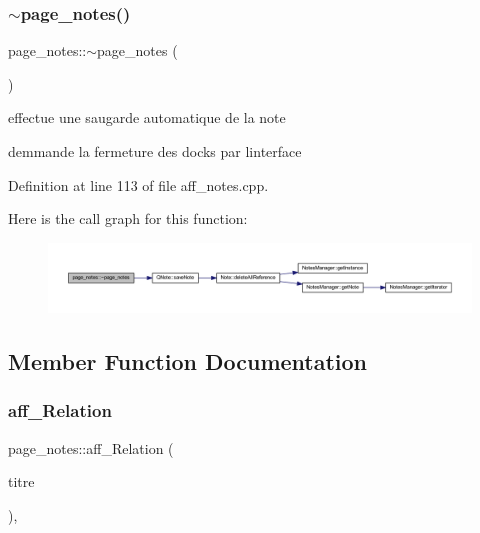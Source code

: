 \subsubsection{\texorpdfstring{$\sim$page\+\_\+notes()}{~page\_notes()}}
{\footnotesize\ttfamily page\+\_\+notes\+::$\sim$page\+\_\+notes (\begin{DoxyParamCaption}{ }\end{DoxyParamCaption})}



effectue une saugarde automatique de la note 

demmande la fermeture des docks par l\textquotesingle{}interface 

Definition at line 113 of file aff\+\_\+notes.\+cpp.

Here is the call graph for this function\+:\nopagebreak
\begin{figure}[H]
\begin{center}
\leavevmode
\includegraphics[width=350pt]{classpage__notes_a736d7d7d13818c43a20b20127845c6c0_cgraph}
\end{center}
\end{figure}


\subsection{Member Function Documentation}
\mbox{\label{classpage__notes_a5c00719607b3e0f3a78c3b35b6df4df9}} 
\subsubsection{\texorpdfstring{aff\+\_\+\+Relation}{aff\_Relation}}
{\footnotesize\ttfamily page\+\_\+notes\+::aff\+\_\+\+Relation (\begin{DoxyParamCaption}\item[{Q\+String}]{titre }\end{DoxyParamCaption})\hspace{0.3cm}{\ttfamily [inline]}, {\ttfamily [slot]}}



